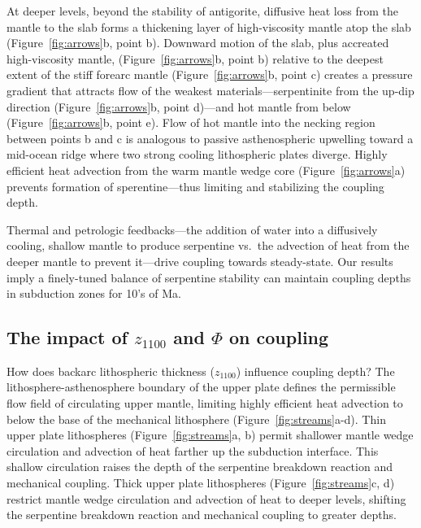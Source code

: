 \documentclass[draft,linenumbers]{agujournal2018}
\begin{document}
At deeper levels, beyond the stability of antigorite, diffusive heat
loss from the mantle to the slab forms a thickening layer of
high-viscosity mantle atop the slab (Figure~\ref{fig:arrows}b, point b).
Downward motion of the slab, plus accreated high-viscosity mantle,
(Figure~\ref{fig:arrows}b, point b) relative to the deepest extent of
the stiff forearc mantle (Figure~\ref{fig:arrows}b, point c) creates a
pressure gradient that attracts flow of the weakest
materials---serpentinite from the up-dip direction
(Figure~\ref{fig:arrows}b, point d)---and hot mantle from below
(Figure~\ref{fig:arrows}b, point e). Flow of hot mantle into the necking
region between points b and c is analogous to passive asthenospheric
upwelling toward a mid-ocean ridge where two strong cooling lithospheric
plates diverge. Highly efficient heat advection from the warm mantle
wedge core (Figure~\ref{fig:arrows}a) prevents formation of
sperentine---thus limiting and stabilizing the coupling depth.

Thermal and petrologic feedbacks---the addition of water into a
diffusively cooling, shallow mantle to produce serpentine vs.~the
advection of heat from the deeper mantle to prevent it---drive coupling
towards steady-state. Our results imply a finely-tuned balance of
serpentine stability can maintain coupling depths in subduction zones
for 10's of Ma.

\subsection{\texorpdfstring{The impact of \(z_{1100}\) and \(\Phi\) on
coupling}{The impact of z\_\{1100\} and \textbackslash Phi on coupling}}

How does backarc lithospheric thickness (\(z_{1100}\)) influence
coupling depth? The lithosphere-asthenosphere boundary of the upper
plate defines the permissible flow field of circulating upper mantle,
limiting highly efficient heat advection to below the base of the
mechanical lithosphere (Figure~\ref{fig:streams}a-d). Thin upper plate
lithospheres (Figure~\ref{fig:streams}a, b) permit shallower mantle
wedge circulation and advection of heat farther up the subduction
interface. This shallow circulation raises the depth of the serpentine
breakdown reaction and mechanical coupling. Thick upper plate
lithospheres (Figure~\ref{fig:streams}c, d) restrict mantle wedge
circulation and advection of heat to deeper levels, shifting the
serpentine breakdown reaction and mechanical coupling to greater depths.
\end{document}
